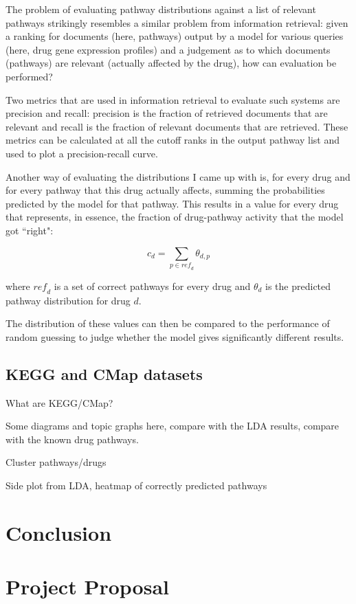 \documentclass[12pt,a4paper,twoside,openright]{report}
\begin{document}
The problem of evaluating pathway distributions against a list of relevant pathways strikingly resembles a similar problem from information retrieval: given a ranking for documents (here, pathways) output by a model for various queries (here, drug gene expression profiles) and a judgement as to which documents (pathways) are relevant (actually affected by the drug), how can evaluation be performed?

Two metrics that are used in information retrieval to evaluate such systems are precision and recall: precision is the fraction of retrieved documents that are relevant and recall is the fraction of relevant documents that are retrieved. These metrics can be calculated at all the cutoff ranks in the output pathway list and used to plot a precision-recall curve.

Another way of evaluating the distributions I came up with is, for every drug and for every pathway that this drug actually affects, summing the probabilities predicted by the model for that pathway. This results in a value for every drug that represents, in essence, the fraction of drug-pathway activity that the model got ``right":

\begin{equation}
c_d = \sum\limits_{p \in \mathit{ref}_d}{\theta_{d, p}}
\end{equation}

where $\mathit{ref}_d$ is a set of correct pathways for every drug and $\theta_d$ is the predicted pathway distribution for drug $d$.

The distribution of these values can then be compared to the performance of random guessing to judge whether the model gives significantly different results.

\section{KEGG and CMap datasets}

What are KEGG/CMap?

Some diagrams and topic graphs here, compare with the LDA results, compare with the known drug pathways.

Cluster pathways/drugs

Side plot from LDA, heatmap of correctly predicted pathways

\chapter{Conclusion}



\appendix

\chapter{Project Proposal}


\end{document}

